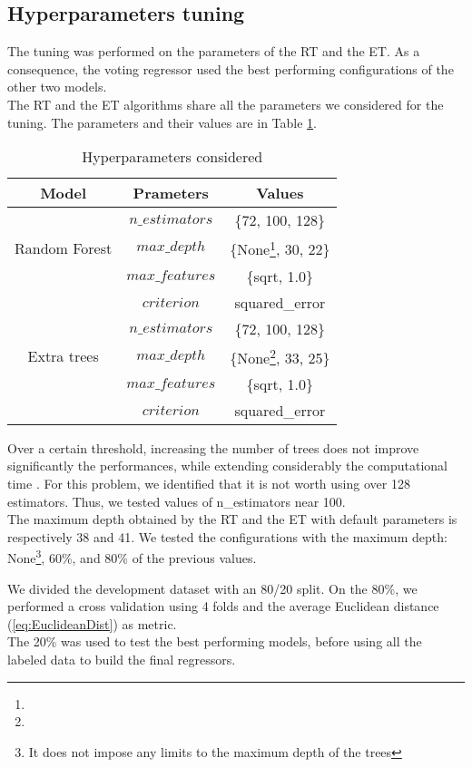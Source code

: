 \documentclass[conference]{IEEEtran}
\begin{document}
\subsection{Hyperparameters tuning}
The tuning was performed on the parameters of the RT and the ET. As a consequence, the voting regressor used the best performing configurations of the other two models. \\
The RT and the ET algorithms share all the parameters we considered for the tuning. The parameters and their values are in Table \ref{tab:tabHP}.
\begin{table}[h]
    \centering
    \caption{Hyperparameters considered}
    \label{tab:tabHP}
    \begin{tabular}{|c|c|c|}
        \hline
        \textbf{Model} & \textbf{Prameters} & \textbf{Values} \\
        \hline
        &$n\_estimators$&\{72, 100, 128\}\\
        Random Forest&$max\_depth$&\{None\footnote[1]{}, 30, 22\}\\
        &$max\_features$&\{sqrt, 1.0\}\\
        &$criterion$&squared\_error\\
        \hline
        &$n\_estimators$& \{72, 100, 128\} \\
        Extra trees&$max\_depth$&\{None\footnote[1]{}, 33, 25\}\\
        &$max\_features$&\{sqrt, 1.0\}\\
        &$criterion$&squared\_error\\
        \hline
    \end{tabular}
\end{table}

Over a certain threshold, increasing the number of trees does not improve significantly the performances, while extending considerably the computational time \cite{limitNumTrees}. For this problem, we identified that it is not worth using over 128 estimators. Thus, we tested values of n\_estimators near 100. \\

The maximum depth obtained by the RT and the ET with default parameters is respectively 38 and 41. We tested the configurations with the maximum depth: None\footnote[1]{It does not impose any limits to the maximum depth of the trees}, 60\%, and 80\% of the previous values. 

We divided the development dataset with an 80/20 split. On the 80\%, we performed a cross validation using 4 folds and the average Euclidean distance (\ref{eq:EuclideanDist}) as metric.\\
The 20\% was used to test the best performing models, before using all the labeled data to build the final regressors.
\end{document}
